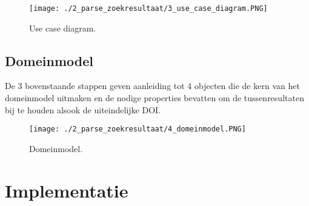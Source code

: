 \begin{figure}[h!]
    \centering
    \texttt{[image: ./2\_parse\_zoekresultaat/3\_use\_case\_diagram.PNG]}
    \caption[Use case diagram.]{\label{fig:Use case diagram}Use case diagram.}
\end{figure}
\subsection{Domeinmodel}
De 3 bovenstaande stappen geven aanleiding tot 4 objecten die de kern van het domeinmodel uitmaken en de nodige properties bevatten om de tussenresultaten bij te houden alsook de uiteindelijke DOI.
\begin{figure}[h!]
    \centering
    \texttt{[image: ./2\_parse\_zoekresultaat/4\_domeinmodel.PNG]}
    \caption[Domeinmodel.]{\label{fig:Domeinmodel}Domeinmodel.}
\end{figure}
\newpage
\section{Implementatie}
